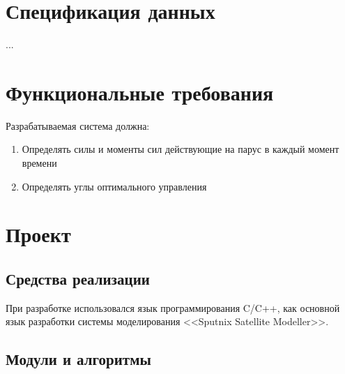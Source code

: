 \usetikzlibrary{patterns}

\section{Спецификация данных}
...
\section{Функциональные требования}
\noindent\indent Разрабатываемая система должна:
\begin{enumerate}
  \item Определять силы и моменты сил действующие на парус в каждый момент времени
  \item Определять углы оптимального управления
\end{enumerate}
\section{Проект}
\subsection{Средства реализации}
\noindent\indent При разработке использовался язык программирования C/C++,
как основной язык разработки системы моделирования <<Sputnix Satellite Modeller>>.
\subsection{Модули и алгоритмы}
